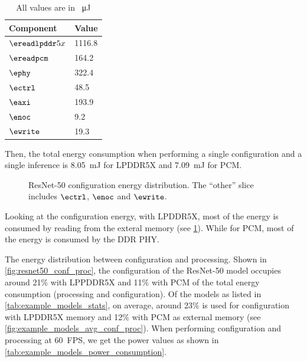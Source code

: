 \begin{table}[hbtp]
    \centering
    \begin{tabular}{@{}ll@{}}
    \toprule
    \textbf{Component} & \textbf{Value} \\
    \midrule
    $\ereadlpddr5x$ & 1116.8 \\
    $\ereadpcm$ & 164.2 \\
    $\ephy$ & 322.4 \\
    $\ectrl$ & 48.5 \\
    $\eaxi$ & 193.9 \\
    $\enoc$ & 9.2 \\
    $\ewrite$ & 19.3 \\
    \bottomrule
    \end{tabular}
    \caption{All values are in \SI{}{\micro\joule}}
    \label{tab:resnet50_energy}
\end{table}

Then, the total energy consumption when performing a single configuration and a single inference is \SI{8.05}{mJ} for LPDDR5X and \SI{7.09}{mJ} for PCM.

\begin{figure}[hbtp]
    \centering
    \hfill
    \caption{ResNet-50 configuration energy distribution. The ``other'' slice includes $\ectrl$, $\enoc$ and $\ewrite$.}
    \label{fig:resnet50_conf_energy_distribution}
\end{figure}


Looking at the configuration energy, with LPDDR5X, most of the energy is consumed by reading from the exteral memory (see \cref{fig:resnet50_conf_energy_distribution}).
While for PCM, most of the energy is consumed by the DDR PHY.

The energy distribution between configuration and processing.
Shown in \cref{fig:resnet50_conf_proc}, the configuration of the ResNet-50 model occupies around 21\% with LPPDDR5X and 11\% with PCM of the total energy consumption (processing and configuration).
Of the models as listed in \cref{tab:example_models_stats}, on average, around 23\% is used for configuration with LPDDR5X memory and 12\% with PCM as external memory (see \cref{fig:example_models_avg_conf_proc}).
When performing configuration and processing at \SI{60}{FPS}, we get the power values as shown in \cref{tab:example_models_power_consumption}.

